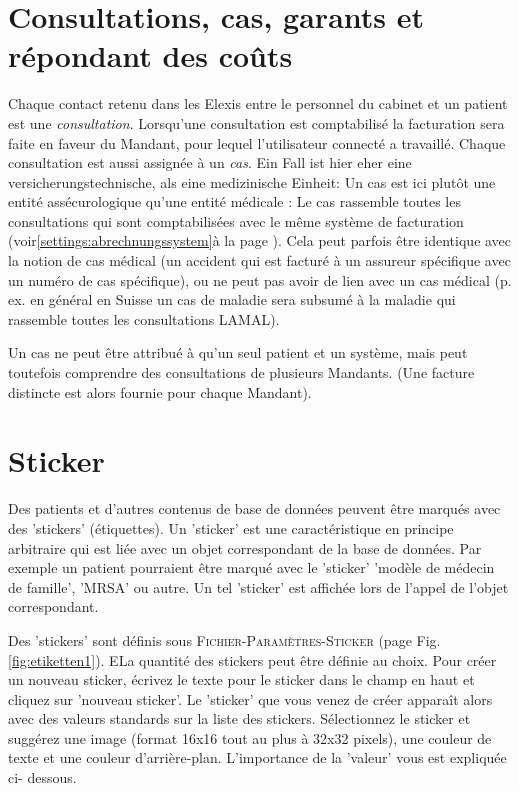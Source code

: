 \section{Consultations, cas, garants et répondant des coûts}
 Chaque contact retenu dans les Elexis entre le personnel du cabinet et un patient est une  \textit{consultation}. Lorsqu'une consultation est comptabilisé la facturation sera faite en faveur du Mandant, pour lequel l'utilisateur connecté a travaillé.
\label{definition:fall}
Chaque consultation est aussi assignée à un \textit{cas}. Ein Fall ist hier eher eine versicherungstechnische, als eine medizinische Einheit: Un cas est ici plutôt une entité assécurologique qu'une entité médicale : Le cas rassemble toutes les consultations qui sont comptabilisées avec le même système de facturation (voir\ref{settings:abrechnungssystem}à la page \pageref{settings:abrechnungssystem}). Cela peut parfois être identique avec la notion de cas médical (un accident qui est facturé à un assureur spécifique avec un numéro de cas spécifique), ou ne peut pas avoir de lien avec un cas médical  (p. ex. en général en Suisse un cas de maladie sera subsumé à la \glqq maladie\grqq{} qui rassemble toutes les consultations LAMAL).

Un cas ne peut être attribué à qu'un seul patient et un système, mais peut toutefois comprendre des consultations de plusieurs Mandants. (Une facture distincte est alors fournie pour chaque Mandant).

\section{Sticker}
\label{Etiketten}
Des patients et d'autres contenus de base de données peuvent être marqués avec des 'stickers' (étiquettes). Un 'sticker' est une caractéristique en principe arbitraire qui est liée avec un objet correspondant de la base de données. Par exemple un patient pourraient être marqué avec le 'sticker' 'modèle de médecin de famille', 'MRSA' ou autre. Un tel 'sticker' est affichée lors de l'appel de l'objet correspondant.

 Des 'stickers' sont définis sous \textsc{Fichier-Paramètres-Sticker} (page Fig. \ref{fig:etiketten1}). ELa quantité des stickers peut être définie au choix. Pour créer un nouveau sticker, écrivez le texte pour le sticker dans le champ en haut et cliquez sur 'nouveau sticker'. Le 'sticker' que vous venez de créer apparaît alors avec des valeurs standards sur la liste des stickers. Sélectionnez le sticker et suggérez une image (format 16x16 tout au plus à 32x32 pixels), une couleur de texte et une couleur d'arrière-plan.
L'importance de la  'valeur' vous est expliquée ci- dessous.


